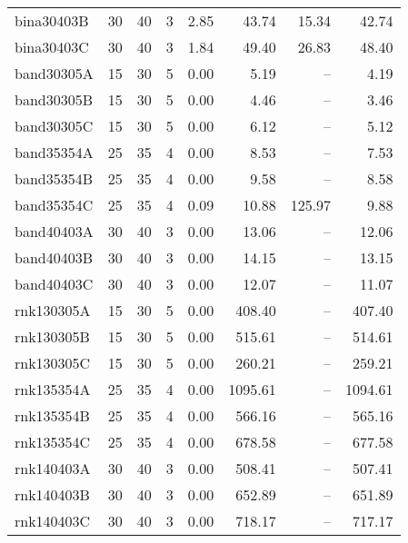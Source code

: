 \begin{scriptsize}
\begin{table}[h]
\begin{tabular*}{\linewidth}{@{\extracolsep{\fill}}lrrrrrrr@{}}
bina30403B & \num{30} & \num{40} & \num{3} & \num{2.85} & \num{43.74} & \num{15.34} & \num{42.74} \\ 
bina30403C & \num{30} & \num{40} & \num{3} & \num{1.84} & \num{49.40} & \num{26.83} & \num{48.40} \\ 
band30305A & \num{15} & \num{30} & \num{5} & \num{0.00} & \num{5.19} & -- & \num{4.19} \\ 
band30305B & \num{15} & \num{30} & \num{5} & \num{0.00} & \num{4.46} & -- & \num{3.46} \\ 
band30305C & \num{15} & \num{30} & \num{5} & \num{0.00} & \num{6.12} & -- & \num{5.12} \\ 
band35354A & \num{25} & \num{35} & \num{4} & \num{0.00} & \num{8.53} & -- & \num{7.53} \\ 
band35354B & \num{25} & \num{35} & \num{4} & \num{0.00} & \num{9.58} & -- & \num{8.58} \\ 
band35354C & \num{25} & \num{35} & \num{4} & \num{0.09} & \num{10.88} & \num{125.97} & \num{9.88} \\ 
band40403A & \num{30} & \num{40} & \num{3} & \num{0.00} & \num{13.06} & -- & \num{12.06} \\ 
band40403B & \num{30} & \num{40} & \num{3} & \num{0.00} & \num{14.15} & -- & \num{13.15} \\ 
band40403C & \num{30} & \num{40} & \num{3} & \num{0.00} & \num{12.07} & -- & \num{11.07} \\ 
rnk130305A & \num{15} & \num{30} & \num{5} & \num{0.00} & \num{408.40} & -- & \num{407.40} \\ 
rnk130305B & \num{15} & \num{30} & \num{5} & \num{0.00} & \num{515.61} & -- & \num{514.61} \\ 
rnk130305C & \num{15} & \num{30} & \num{5} & \num{0.00} & \num{260.21} & -- & \num{259.21} \\ 
rnk135354A & \num{25} & \num{35} & \num{4} & \num{0.00} & \num{1095.61} & -- & \num{1094.61} \\ 
rnk135354B & \num{25} & \num{35} & \num{4} & \num{0.00} & \num{566.16} & -- & \num{565.16} \\ 
rnk135354C & \num{25} & \num{35} & \num{4} & \num{0.00} & \num{678.58} & -- & \num{677.58} \\ 
rnk140403A & \num{30} & \num{40} & \num{3} & \num{0.00} & \num{508.41} & -- & \num{507.41} \\ 
rnk140403B & \num{30} & \num{40} & \num{3} & \num{0.00} & \num{652.89} & -- & \num{651.89} \\ 
rnk140403C & \num{30} & \num{40} & \num{3} & \num{0.00} & \num{718.17} & -- & \num{717.17} \\ 

\end{tabular*}
\end{table}
\end{scriptsize}
